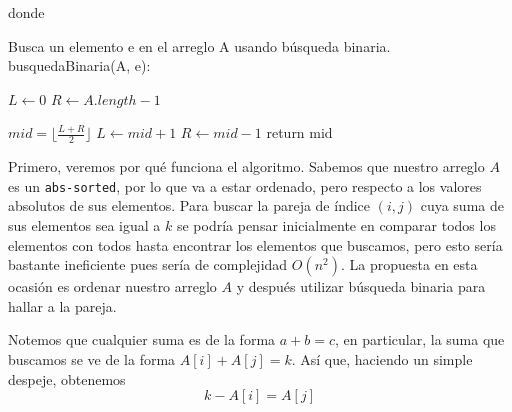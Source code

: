 \documentclass[letterpaper,11pt]{article}
\begin{document}
\begin{enumerate}
    donde 
    \begin{center}
        \begin{minipage}[c]{0.75\textwidth}
        \begin{algorithm}[H]
            \caption{Busca un elemento e en el arreglo A usando búsqueda binaria. 
                     \\ busquedaBinaria(A, e):} 
            \begin{algorithmic}[1]
                \State $L \gets 0$
                \State $R \gets A.length - 1$
    
                    \State $mid = \lfloor \frac{L + R}{2} \rfloor$
                        \State $L \gets mid + 1$
                    \Else {}
                        \State $R \gets mid -1$
                    \Else 
                        \State return mid 
                    \EndIf
                    \EndIf
                \EndWhile
                
            \end{algorithmic} 
        \end{algorithm}
        \end{minipage}
    \end{center}

    Primero, veremos por qué funciona el algoritmo. Sabemos que nuestro arreglo 
    $A$ es un \texttt{abs-sorted}, por lo que va a estar ordenado, pero
    respecto a los valores absolutos de sus elementos. Para buscar la pareja 
    de índice $(i, j)$ cuya suma de sus elementos sea igual a $k$ se podría 
    pensar inicialmente en comparar todos los elementos con todos hasta 
    encontrar los elementos que buscamos, pero esto sería bastante ineficiente 
    pues sería de complejidad $O(n^2)$. La propuesta en esta ocasión es 
    ordenar nuestro arreglo $A$ y después utilizar búsqueda binaria para hallar 
    a la pareja. 

    Notemos que cualquier suma es de la forma $a + b = c$, en particular, la 
    suma que buscamos se ve de la forma $A[i] + A[j] = k$. Así que, haciendo 
    un simple despeje, obtenemos
    \begin{equation*}
        k - A[i] = A[j]
    \end{equation*}


\end{enumerate}
\end{document}
